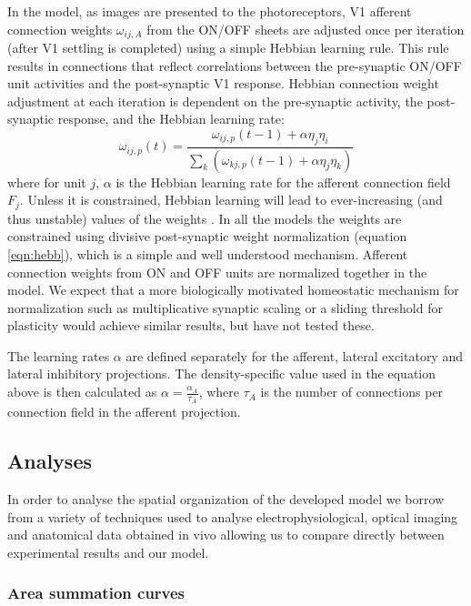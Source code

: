 In the model, as images are presented to the photoreceptors, V1
afferent connection weights $\omega_{ij,A}$ from the ON/OFF sheets are
adjusted once per iteration (after V1 settling is completed) using a
simple Hebbian learning rule. This rule results in connections that
reflect correlations between the pre-synaptic ON/OFF unit activities
and the post-synaptic V1 response.  Hebbian connection weight
adjustment at each iteration is dependent on the pre-synaptic
activity, the post-synaptic response, and the Hebbian learning rate:
\begin{equation}
\omega_{ij,p}(t)=\frac{\omega_{ij,p}(t-1)+\alpha\eta_{j}\eta_{i}}{\sum_{k}\left(\omega_{kj,p}(t-1)+\alpha\eta_{j}\eta_{k}\right)}
\label{eqn:hebb}
\end{equation}
where for unit $j$, $\alpha$ is the Hebbian learning rate for the
afferent connection field $F_{j}$. Unless it is constrained, Hebbian
learning will lead to ever-increasing (and thus unstable) values of
the weights \citep{Rochester1956}. In all the models the weights are
constrained using divisive post-synaptic weight normalization
(equation \ref{eqn:hebb}), which is a simple and well understood
mechanism. Afferent connection weights from ON and OFF units are
normalized together in the model. We expect that a more biologically
motivated homeostatic mechanism for normalization such as
multiplicative synaptic scaling
\citep{Turrigiano1999,Turrigiano2004,Sullivan2006} or a sliding
threshold for plasticity \citep{Bienenstock1982} would achieve similar
results, but have not tested these.

The learning rates $\alpha$ are defined separately for the afferent,
lateral excitatory and lateral inhibitory projections. The
density-specific value used in the equation above is then calculated
as $\alpha=\frac{\alpha_{A}}{\tau_{A}}$, where $\tau_{A}$ is the
number of connections per connection field in the afferent projection.

\subsection{Analyses}

In order to analyse the spatial organization of the developed model we
borrow from a variety of techniques used to analyse
electrophysiological, optical imaging and anatomical data obtained in
vivo allowing us to compare directly between experimental results and
our model.

\subsubsection{Area summation curves}

